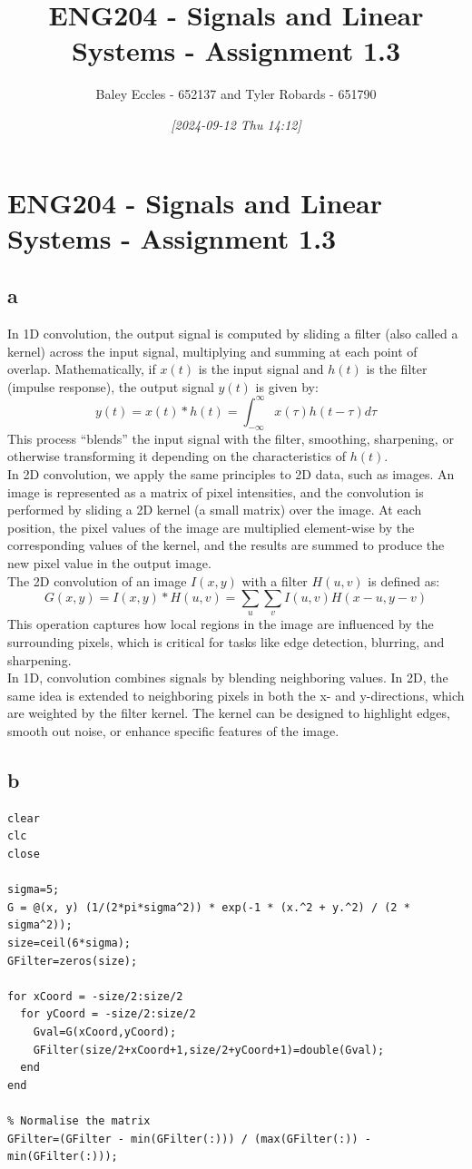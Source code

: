 \documentclass[11pt]{article}
\author{Baley Eccles - 652137 and Tyler Robards - 651790}
\date{\textit{{[}2024-09-12 Thu 14:12]}}
\title{ENG204 - Signals and Linear Systems - Assignment 1.3}
\begin{document}
\maketitle
\tableofcontents

\section{ENG204 - Signals and Linear Systems - Assignment 1.3}
\label{sec:org5066401}
\subsection{a}
\label{sec:orgfdf5ece}
In 1D convolution, the output signal is computed by sliding a filter (also called a kernel) across the input signal, multiplying and summing at each point of overlap. Mathematically, if \(x(t)\) is the input signal and \(h(t)\) is the filter (impulse response), the output signal \(y(t)\) is given by:
\[y(t)=x(t)*h(t)=\int_{-\infty}^{\infty}x(\tau)h(t-\tau)d\tau\]
This process ``blends'' the input signal with the filter, smoothing, sharpening, or otherwise transforming it depending on the characteristics of \(h(t)\). \\
In 2D convolution, we apply the same principles to 2D data, such as images. An image is represented as a matrix of pixel intensities, and the convolution is performed by sliding a 2D kernel (a small matrix) over the image. At each position, the pixel values of the image are multiplied element-wise by the corresponding values of the kernel, and the results are summed to produce the new pixel value in the output image.\\
The 2D convolution of an image \(I(x,y)\) with a filter \(H(u,v)\) is defined as:
\[G(x,y)=I(x,y)*H(u,v)=\sum_u\sum_vI(u,v)H(x-u,y-v)\]
This operation captures how local regions in the image are influenced by the surrounding pixels, which is critical for tasks like edge detection, blurring, and sharpening.\\
In 1D, convolution combines signals by blending neighboring values. In 2D, the same idea is extended to neighboring pixels in both the x- and y-directions, which are weighted by the filter kernel. The kernel can be designed to highlight edges, smooth out noise, or enhance specific features of the image.
\subsection{b}
\label{sec:org487b0dc}
\begin{verbatim}
clear
clc
close

sigma=5;
G = @(x, y) (1/(2*pi*sigma^2)) * exp(-1 * (x.^2 + y.^2) / (2 * sigma^2));
size=ceil(6*sigma);
GFilter=zeros(size);

for xCoord = -size/2:size/2
  for yCoord = -size/2:size/2
    Gval=G(xCoord,yCoord);
    GFilter(size/2+xCoord+1,size/2+yCoord+1)=double(Gval);
  end
end

% Normalise the matrix
GFilter=(GFilter - min(GFilter(:))) / (max(GFilter(:)) - min(GFilter(:)));

\end{verbatim}
\end{document}
